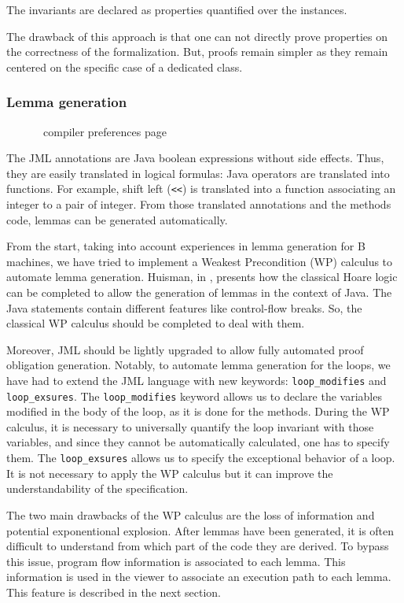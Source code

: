  The invariants are declared as properties quantified over the instances.

 The drawback of this approach is that one can not directly prove properties on the correctness
 of the formalization.  But, proofs remain simpler as they remain
 centered on the specific case of a dedicated class.
\subsubsection{Lemma generation}
\begin{figure}[p]
 \caption{\JACK\ compiler preferences page}
 \label{JACKcompprefpage}
\end{figure}
 The JML annotations are Java boolean expressions without side
 effects.  Thus, they are easily translated in logical formulas: Java operators are
 translated into functions. For example, shift left (\texttt{<<}) is
 translated into a function associating an integer to a pair of
 integer.  From those translated annotations and the methods code,
 lemmas can be generated automatically.

 From the start, taking into account
 experiences in lemma generation for B machines, we have tried to
 implement a Weakest Precondition (WP) calculus to automate lemma
 generation.  Huisman, in \cite{Huisman:PhD}, presents how the
 classical Hoare logic can be completed to allow the generation of
 lemmas in the context of Java.  The Java statements contain different
 features like control-flow breaks.  So, the classical WP calculus
 should be completed to deal with them.

 Moreover, JML should be lightly upgraded to allow fully automated proof obligation generation.
 Notably, to
 automate lemma generation for the loops, we have had to extend
 the JML language with new keywords: \texttt{loop\_modifies} and \texttt{loop\_exsures}.
 The \texttt{loop\_modifies} keyword allows us to declare the variables modified in
the body of the loop, as it is done for the methods. During the WP calculus, it is necessary to universally
quantify the loop invariant with those variables, and since they cannot be automatically calculated, one has to
specify them.
 The \texttt{loop\_exsures} allows us to specify the exceptional behavior of a loop. It is not necessary to apply
the WP calculus but it can improve the understandability of the specification.

 The two main drawbacks of the WP calculus are the loss of information and
 potential exponentional explosion.  After lemmas have been generated,
 it is often difficult to understand from which part of the code they
 are derived.  To bypass this issue, program flow information is
 associated to each lemma.  This information is used in the viewer
 to associate an execution path to each lemma. This feature is described in the next section.

